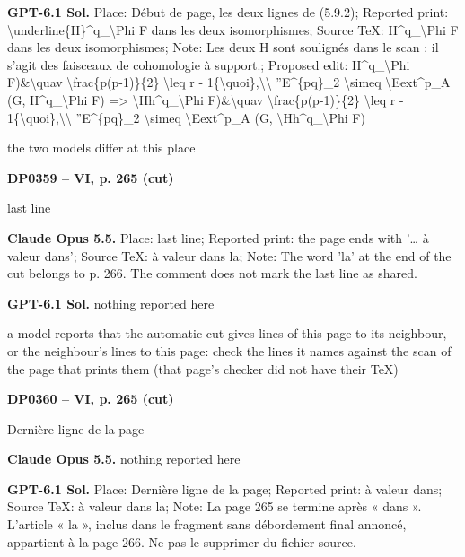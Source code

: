 \textbf{GPT-6.1 Sol.} Place: Début de page, les deux lignes de (5.9.2); Reported print: \textbackslash{}underline\{H\}\textasciicircum{}q\_\textbackslash{}Phi F dans les deux isomorphismes; Source TeX: H\textasciicircum{}q\_\textbackslash{}Phi F dans les deux isomorphismes; Note: Les deux H sont soulignés dans le scan : il s'agit des faisceaux de cohomologie à support.; Proposed edit: H\textasciicircum{}q\_\textbackslash{}Phi F)\&\textbackslash{}quav \textbackslash{}frac\{p(p-1)\}\{2\} \textbackslash{}leq r - 1\{\textbackslash{}quoi\},\textbackslash{}\textbackslash{} ''E\textasciicircum{}\{pq\}\_2 \textbackslash{}simeq \textbackslash{}Eext\textasciicircum{}p\_A (G, H\textasciicircum{}q\_\textbackslash{}Phi F) =\allowbreak > \textbackslash{}Hh\textasciicircum{}q\_\textbackslash{}Phi F)\&\textbackslash{}quav \textbackslash{}frac\{p(p-1)\}\{2\} \textbackslash{}leq r - 1\{\textbackslash{}quoi\},\textbackslash{}\textbackslash{} ''E\textasciicircum{}\{pq\}\_2 \textbackslash{}simeq \textbackslash{}Eext\textasciicircum{}p\_A (G, \textbackslash{}Hh\textasciicircum{}q\_\textbackslash{}Phi F)\par
the two models differ at this place\par
\par\noindent\hypertarget{DP0359}{}\textbf{DP0359 -- VI, p. 265 (cut)}\par
last line\par
\textbf{Claude Opus 5.5.} Place: last line; Reported print: the page ends with '… à valeur dans'; Source TeX: à valeur dans la; Note: The word 'la' at the end of the cut belongs to p. 266. The comment does not mark the last line as shared.\par
\textbf{GPT-6.1 Sol.} nothing reported here\par
a model reports that the automatic cut gives lines of this page to its neighbour, or the neighbour's lines to this page: check the lines it names against the scan of the page that prints them (that page's checker did not have their TeX)\par
\par\noindent\hypertarget{DP0360}{}\textbf{DP0360 -- VI, p. 265 (cut)}\par
Dernière ligne de la page\par
\textbf{Claude Opus 5.5.} nothing reported here\par
\textbf{GPT-6.1 Sol.} Place: Dernière ligne de la page; Reported print: à valeur dans; Source TeX: à valeur dans la; Note: La page 265 se termine après « dans ». L'article « la », inclus dans le fragment sans débordement final annoncé, appartient à la page 266. Ne pas le supprimer du fichier source.\par
